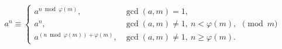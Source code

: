 \[
a^n \equiv
\begin{cases}
a^{n \bmod \varphi(m)}, & \gcd(a,m)=1,\\
a^n, & \gcd(a,m)\ne 1,\ n<\varphi(m),\\
a^{(n\bmod\varphi(m))+\varphi(m)}, & \gcd(a,m)\ne 1,\ n\ge\varphi(m).
\end{cases}
\pmod m
\]
